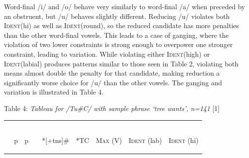 \documentclass[output=paper,
modfonts
]{langscibook}
\begin{document}
Word-final /i/ and /o/ behave very similarly to word-final /a/ when preceded by 
an obstruent, but /u/ behaves slightly different. Reducing /u/ violates both 
\textsc{Ident}(hi) as well as \textsc{Ident}(round), so the reduced candidate 
has more penalties than the other word-final vowels. This leads to a case of 
ganging, where the violation of two lower constraints is strong enough to overpower one stronger constraint, leading to variation. While violating either \textsc{Ident}(high) or \textsc{Ident}(labial) produces patterns similar to those seen in Table 2, violating both means almost double the penalty for that candidate, making reduction a significantly worse choice for /u/ than the other vowels. The ganging and variation is 
illustrated in Table 4. 
\pagebreak
\begin{center}Table 4: \textit{Tableau for /Tu\#C/ with sample phrase ‘tree wants’, n=141}
\renewcommand*\arraystretch{1.2}
\vspace{1.0cm} \scalebox{1}[1]{}{\begin{tabular}[t]{|l||c|c|c|c|c|c|c|c|} 
\hline
 & & & & & & & & \\
  & & & & & & & &\\
 & & & & & & &&  \\
{\textipa{}} & \hspace*{0.1cm} p  \hspace*{0.2cm} & \hspace*{0.1cm} p  \hspace*{0.2cm} & \hspace*{0.1cm} \begin{rotate}{45} \end{rotate} \hspace*{0.2cm} & \hspace*{0.1cm} \begin{rotate}{90} *[+tns]\# \end{rotate} \hspace*{0.2cm} & \hspace*{0.1cm} \begin{rotate}{90} *TC \end{rotate} \hspace*{0.2cm} & \hspace*{0.1cm} \begin{rotate}{90} \textsc{Max} (V) \end{rotate} \hspace*{0.2cm} & \hspace*{0.1cm} \begin{rotate}{90} \textsc{Ident} (lab) \end{rotate} \hspace{0.2cm} & \hspace*{0.1cm} \begin{rotate}{90} \textsc{Ident} (hi) \end{rotate} \hspace*{0.2cm}\\[.5ex]


\end{tabular}}
\end{center}
\end{document}

